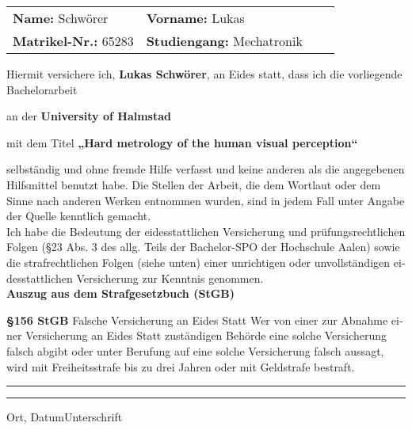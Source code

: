 \begin{otherlanguage}{ngerman}

\vspace*{5mm}

\thispagestyle{empty}

\begin{flushleft}
\begin{tabular}[h]{p{60mm}l p{60mm}l}
\textbf{Name:} Schwörer 			&\textbf{Vorname:} Lukas\\
\textbf{Matrikel-Nr.:} 65283		&\textbf{Studiengang:} Mechatronik\\
\end{tabular}
\end{flushleft}

\vspace*{11mm}

Hiermit versichere ich, \textbf{Lukas Schwörer}, an Eides statt, dass ich die vorliegende Bachelorarbeit

an der \textbf{University of Halmstad}

mit dem Titel \textbf{„Hard metrology of the human visual perception“}

selbständig und ohne fremde Hilfe verfasst und keine anderen als die angegebenen Hilfsmittel benutzt habe. Die Stellen der Arbeit, die dem Wortlaut oder dem Sinne nach anderen Werken entnommen wurden, sind in jedem Fall unter Angabe der Quelle kenntlich gemacht.\\

Ich habe die Bedeutung der eidesstattlichen Versicherung und prüfungsrechtlichen Folgen (\S 23 Abs. 3 des allg. Teils der Bachelor-SPO der Hochschule Aalen) sowie die strafrechtlichen Folgen (siehe unten) einer unrichtigen oder unvollständigen eidesstattlichen Versicherung zur Kenntnis genommen.\\

\vspace*{10mm}
\Large\textbf{Auszug aus dem Strafgesetzbuch (StGB)}


\normalsize\textbf{\S 156 StGB} Falsche Versicherung an Eides Statt
Wer von einer zur Abnahme einer Versicherung an Eides Statt zuständigen Behörde eine solche Versicherung falsch abgibt oder unter Berufung auf eine solche Versicherung falsch aussagt, wird mit Freiheitsstrafe bis zu drei Jahren oder mit Geldstrafe bestraft.

\vspace*{25mm}


\rule[-0.2cm]{5cm}{0.5pt} \hspace*{30mm}\rule[-0.2cm]{5cm}{0.5pt}
\newline
Ort, Datum\hspace*{61.85mm}Unterschrift

\end{otherlanguage}